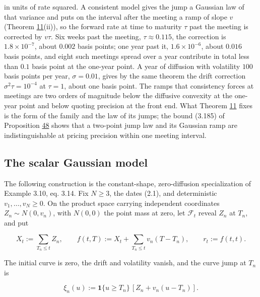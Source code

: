 \documentclass[11pt]{article}
\begin{document}
in units of rate squared. A consistent model gives the jump a Gaussian law of that variance and puts on the interval after the meeting a ramp of slope \(v\) (Theorem \hyperref[res:Theorem-11]{11}(ii)), so the forward rate at time to maturity \(\tau\) past the meeting is corrected by \(v\tau\). Six weeks past the meeting, \(\tau \approx 0.115\), the correction is \(1.8 \times 10^{-7}\), about \(0.002\) basis points; one year past it, \(1.6 \times 10^{-6}\), about \(0.016\) basis points, and eight such meetings spread over a year contribute in total less than \(0.1\) basis point at the one-year point. A year of diffusion with volatility \(100\) basis points per year, \(\sigma = 0.01\), gives by the same theorem the drift correction \(\sigma^2\tau = 10^{-4}\) at \(\tau = 1\), about one basis point. The ramps that consistency forces at meetings are two orders of magnitude below the diffusive convexity at the one-year point and below quoting precision at the front end. What Theorem \hyperref[res:Theorem-11]{11} fixes is the form of the family and the law of its jumps; the bound (3.185) of Proposition \hyperref[res:Proposition-48]{48} shows that a two-point jump law and its Gaussian ramp are indistinguishable at pricing precision within one meeting interval.

\subsection{The scalar Gaussian model}\label{sec:3.10}

The following construction is the constant-shape, zero-diffusion specialization of \cite{fontana2022term} Example 3.10, eq. 3.14. Fix \(N \ge 3\), the dates (2.1), and deterministic \(v_1, \dots, v_N \ge 0\). On the product space carrying independent coordinates \(Z_n \sim N(0, v_n)\), with \(N(0, 0)\) the point mass at zero, let \(\mathcal F_t\) reveal \(Z_n\) at \(T_n\), and put

\begin{equation*}
X_t := \sum_{T_n \le t} Z_n, \qquad f(t, T) := X_t + \sum_{T_n \le t} v_n (T - T_n), \qquad r_t := f(t, t). \tag{3.45}\label{eq:3.45}
\end{equation*}

The initial curve is zero, the drift and volatility vanish, and the curve jump at \(T_n\) is

\begin{equation*}
\xi_n(u) := \mathbf 1\{u \ge T_n\}\,[Z_n + v_n (u - T_n)]. \tag{3.46}\label{eq:3.46}
\end{equation*}
\end{document}
